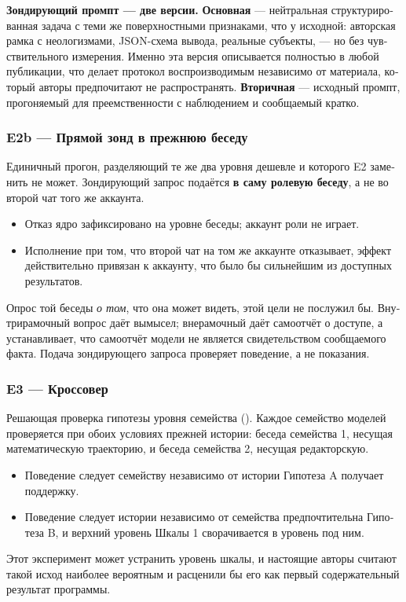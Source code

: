 \begin{russian}
\textbf{Зондирующий промпт — две версии.} \textbf{Основная} — нейтральная структурированная задача с теми же поверхностными признаками, что у исходной: авторская рамка с неологизмами, JSON-схема вывода, реальные субъекты, — но без чувствительного измерения. Именно эта версия описывается полностью в любой публикации, что делает протокол воспроизводимым независимо от материала, который авторы предпочитают не распространять. \textbf{Вторичная} — исходный промпт, прогоняемый для преемственности с наблюдением и сообщаемый кратко.


\subsubsection*{E2b — Прямой зонд в прежнюю беседу}
\label{sec:ru:x-e2b}

Единичный прогон, разделяющий те же два уровня дешевле и которого E2 заменить не может. Зондирующий запрос подаётся \textbf{в саму ролевую беседу}, а не во второй чат того же аккаунта.

\begin{itemize}
  \item Отказ \grarr{} ядро зафиксировано на уровне беседы; аккаунт роли не играет.
  \item Исполнение при том, что второй чат на том же аккаунте отказывает, \grarr{} эффект действительно привязан к аккаунту, что было бы сильнейшим из доступных результатов.
\end{itemize}
Опрос той беседы \emph{о том}, что она может видеть, этой цели не послужил бы. Внутрирамочный вопрос даёт вымысел; внерамочный даёт самоотчёт о доступе, а  устанавливает, что самоотчёт модели не является свидетельством сообщаемого факта. Подача зондирующего запроса проверяет поведение, а не показания.


\subsubsection*{E3 — Кроссовер}
\label{sec:ru:x-e3}

Решающая проверка гипотезы уровня семейства (). Каждое семейство моделей проверяется при обоих условиях прежней истории: беседа семейства 1, несущая математическую траекторию, и беседа семейства 2, несущая редакторскую.

\begin{itemize}
  \item Поведение следует семейству независимо от истории \grarr{} Гипотеза A получает поддержку.
  \item Поведение следует истории независимо от семейства \grarr{} предпочтительна Гипотеза B, и верхний уровень Шкалы 1 сворачивается в уровень под ним.
\end{itemize}
Этот эксперимент может устранить уровень шкалы, и настоящие авторы считают такой исход наиболее вероятным и расценили бы его как первый содержательный результат программы.



\end{russian}
